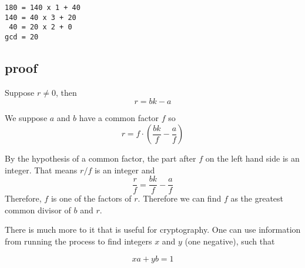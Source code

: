 \documentclass[11pt, oneside]{article}
\begin{document}
\begin{verbatim}
180 = 140 x 1 + 40
140 = 40 x 3 + 20
 40 = 20 x 2 + 0
gcd = 20
\end{verbatim}

\subsection*{proof}
Suppose $r \ne 0$, then
\[ r = bk - a \]

We suppose $a$ and $b$ have a common factor $f$ so
\[ r = f \cdot (\frac{bk}{f} - \frac{a}{f}) \]

By the hypothesis of a common factor, the part after $f$ on the left hand side is an integer.  That means $r/f$ is an integer and
\[ \frac{r}{f} = \frac{bk}{f} - \frac{a}{f} \]
Therefore, $f$ is one of the factors of $r$.  Therefore we can find $f$ as the greatest common divisor of $b$ and $r$.

There is much more to it that is useful for cryptography.  One can use information from running the process to find integers $x$ and $y$ (one negative), such that

\[ xa + yb = 1 \]
\end{document}
